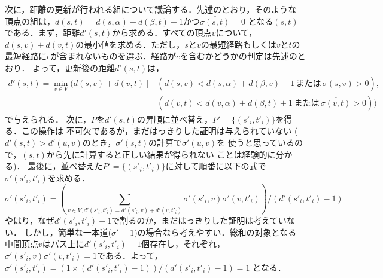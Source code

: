 次に，距離の更新が行われる組について議論する．先述のとおり，そのような
頂点の組は，$d(s,t)=d(s,\alpha)+d(\beta,t)+1$かつ$\overline{\sigma(s,t)}=0$
となる$(s,t)$である．まず，距離$d'(s,t)$から求める．すべての頂点$v$について，
$d(s,v)+d(v,t)$の最小値を求める．ただし，$s$と$v$の最短経路もしくは$v$と$t$の
最短経路に$e$が含まれないものを選ぶ．経路が$e$を含むかどうかの判定は先述のとおり．
よって，更新後の距離$d'(s,t)$は，
\begin{align*}
  d'(s,t) = \min_{v\in V}(d(s,v)+d(v,t)\:|\:
  &(d(s,v)<d(s,\alpha)+d(\beta,v)+1\,または\,\overline{\sigma(s,v)}>0),\\
  &(d(v,t)<d(v,\alpha)+d(\beta,t)+1\,または\,\overline{\sigma(v,t)}>0))
\end{align*}
で与えられる．
次に，$P$を$d'(s,t)$の昇順に並べ替え，$P'=\{(s'_i,t'_i)\}$を得る．この操作は
不可欠であるが，まだはっきりした証明は与えられていない
($d'(s,t)>d'(u,v)$のとき，$\sigma'(s,t)$の計算で$\sigma'(u,v)$を
使うと思っているので，$(s,t)$から先に計算すると正しい結果が得られない
ことは経験的に分かる)．
最後に，並べ替えた$P'=\{(s'_i,t'_i)\}$に対して順番に以下の式で
$\sigma'(s'_i,t'_i)$を求める．
\[ \sigma'(s'_i,t'_i)=\left(\sum_{v\in V,d'(s'_i,t'_i)=d'(s'_i,v)+d'(v,t'_i)}
\sigma'(s'_i,v)\sigma'(v,t'_i)\right) / (d'(s'_i,t'_i)-1) \]
やはり，なぜ$d'(s'_i,t'_i)-1$で割るのか，まだはっきりした証明は考えていない．
しかし，簡単な一本道($\sigma'=1$)の場合なら考えやすい．総和の対象となる
中間頂点$v$はパス上に$d'(s'_i,t'_i)-1$個存在し，それぞれ，
$\sigma'(s'_i,v)\sigma'(v,t'_i)=1$である．よって，
$\sigma'(s'_i,t'_i)=(1\times (d'(s'_i,t'_i)-1))/(d'(s'_i,t'_i)-1)=1$
となる．

